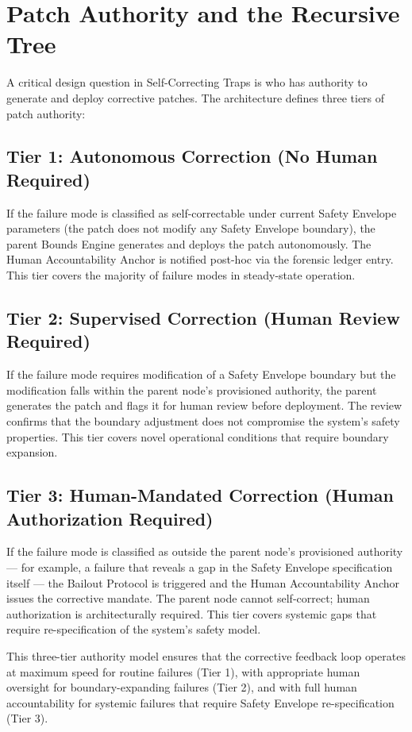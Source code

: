 \documentclass[12pt]{article}
\begin{document}
\section{Patch Authority and the Recursive Tree}
A critical design question in Self-Correcting Traps is who has authority to generate and deploy corrective patches. The architecture defines three tiers of patch authority:

\subsection{Tier 1: Autonomous Correction (No Human Required)}
If the failure mode is classified as self-correctable under current Safety Envelope parameters (the patch does not modify any Safety Envelope boundary), the parent Bounds Engine generates and deploys the patch autonomously. The Human Accountability Anchor is notified post-hoc via the forensic ledger entry. This tier covers the majority of failure modes in steady-state operation.

\subsection{Tier 2: Supervised Correction (Human Review Required)}
If the failure mode requires modification of a Safety Envelope boundary but the modification falls within the parent node's provisioned authority, the parent generates the patch and flags it for human review before deployment. The review confirms that the boundary adjustment does not compromise the system's safety properties. This tier covers novel operational conditions that require boundary expansion.

\subsection{Tier 3: Human-Mandated Correction (Human Authorization Required)}
If the failure mode is classified as outside the parent node's provisioned authority --- for example, a failure that reveals a gap in the Safety Envelope specification itself --- the Bailout Protocol is triggered and the Human Accountability Anchor issues the corrective mandate. The parent node cannot self-correct; human authorization is architecturally required. This tier covers systemic gaps that require re-specification of the system's safety model.

This three-tier authority model ensures that the corrective feedback loop operates at maximum speed for routine failures (Tier 1), with appropriate human oversight for boundary-expanding failures (Tier 2), and with full human accountability for systemic failures that require Safety Envelope re-specification (Tier 3).
\end{document}

